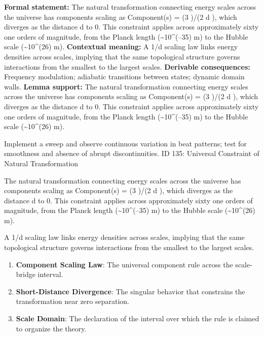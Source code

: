 \begingroup\footnotesize\setlength{\emergencystretch}{3em}\sloppy
\textbf{Formal statement:} The natural transformation connecting energy scales across the universe has components scaling as Component(s) = (3         )/(2   d ), which diverges as the distance d to 0. This constraint applies across approximately sixty one orders of magnitude, from the Planck length (\textasciitilde{}10\textasciicircum{}(--35) m) to the Hubble scale (\textasciitilde{}10\textasciicircum{}(26) m).
\textbf{Contextual meaning:} A 1/d  scaling law links energy densities across scales, implying that the same topological structure governs interactions from the smallest to the largest scales.
\textbf{Derivable consequences:} Frequency modulation; adiabatic transitions between states; dynamic domain walls.
\textbf{Lemma support:} The natural transformation connecting energy scales across the universe has components scaling as Component(s) = (3         )/(2   d ), which diverges as the distance d to 0. This constraint applies across approximately sixty one orders of magnitude, from the Planck length (\textasciitilde{}10\textasciicircum{}(--35) m) to the Hubble scale (\textasciitilde{}10\textasciicircum{}(26) m).\par
\endgroup

Implement a sweep and observe continuous variation in beat patterns; test for smoothness and absence of abrupt discontinuities. ID 135: Universal Constraint of Natural Transformation

The natural transformation connecting energy scales across the universe has components scaling as Component(s) = (3         )/(2   d ), which diverges as the distance d to 0. This constraint applies across approximately sixty one orders of magnitude, from the Planck length (\textasciitilde{}10\textasciicircum{}(--35) m) to the Hubble scale (\textasciitilde{}10\textasciicircum{}(26) m).

A 1/d  scaling law links energy densities across scales, implying that the same topological structure governs interactions from the smallest to the largest scales.
\endgroup

\begin{enumerate}[leftmargin=1.6em,itemsep=6pt,topsep=4pt]
\item \textbf{Component Scaling Law}: The universal component rule across the scale-bridge interval.
\item \textbf{Short-Distance Divergence}: The singular behavior that constrains the transformation near zero separation.
\item \textbf{Scale Domain}: The declaration of the interval over which the rule is claimed to organize the theory.
\end{enumerate}


